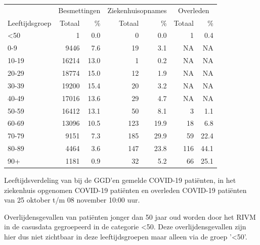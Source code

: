 \documentclass[
  english,
  man,floatsintext]{apa6}
\begin{document}
\begin{table}
\centering\begingroup\fontsize{11}{13}\selectfont

\begin{threeparttable}
\begin{tabular}{lrrrrrr}
\toprule
\multicolumn{1}{c}{ } & \multicolumn{2}{c}{Besmettingen} & \multicolumn{2}{c}{Ziekenhuisopnames} & \multicolumn{2}{c}{Overleden} \\
\cmidrule(l{3pt}r{3pt}){2-3} \cmidrule(l{3pt}r{3pt}){4-5} \cmidrule(l{3pt}r{3pt}){6-7}
Leeftijdsgroep & Totaal & \% & Totaal & \% & Totaal & \%\\
\midrule
<50 & 1 & 0.0 & 0 & 0.0 & 1 & 0.4\\
0-9 & 9446 & 7.6 & 19 & 3.1 & NA & NA\\
10-19 & 16214 & 13.0 & 1 & 0.2 & NA & NA\\
20-29 & 18774 & 15.0 & 12 & 1.9 & NA & NA\\
30-39 & 19200 & 15.4 & 20 & 3.2 & NA & NA\\
40-49 & 17016 & 13.6 & 29 & 4.7 & NA & NA\\
50-59 & 16412 & 13.1 & 50 & 8.1 & 3 & 1.1\\
60-69 & 13096 & 10.5 & 123 & 19.9 & 18 & 6.8\\
70-79 & 9151 & 7.3 & 185 & 29.9 & 59 & 22.4\\
80-89 & 4464 & 3.6 & 147 & 23.8 & 116 & 44.1\\
90+ & 1181 & 0.9 & 32 & 5.2 & 66 & 25.1\\
\bottomrule
\end{tabular}
\begin{tablenotes}
\item[1] Leeftijdsverdeling van bij de GGD’en gemelde COVID-19 patiënten, in het ziekenhuis opgenomen COVID-19 patiënten en overleden COVID-19 patiënten van 25 oktober t/m 08 november 10:00 uur.
\item[2] Overlijdensgevallen van patiënten jonger dan 50 jaar oud worden door het RIVM in de casusdata gegroepeerd in de categorie <50. Deze overlijdensgevallen zijn hier dus niet zichtbaar in deze leeftijdsgroepen maar alleen via de groep '<50'.
\end{tablenotes}
\end{threeparttable}
\endgroup{}
\end{table}

\newpage
\end{document}
